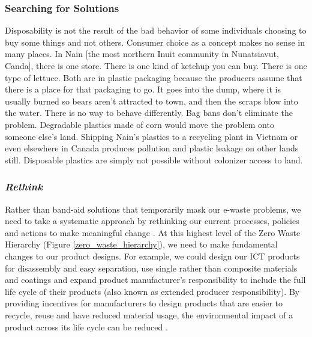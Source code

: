 \documentclass{article}
\begin{document}
\subsubsection{Searching for Solutions}
\begin{fquote}
Disposability is not the result of the bad behavior of some individuals choosing to buy some things and not others. Consumer choice as a concept makes no sense in many places. In Nain [the most northern Inuit community in Nunatsiavut, Canda], there is one store. There is one kind of ketchup you can buy. There is one type of lettuce. Both are in plastic packaging because the producers assume that there is a place for that packaging to go. It goes into the dump, where it is usually burned so bears aren't attracted to town, and then the scraps blow into the water. There is no way to behave differently. Bag bans don't eliminate the problem. Degradable plastics made of corn would move the problem onto someone else's land. Shipping Nain's plastics to a recycling plant in Vietnam or even elsewhere in Canada produces pollution and plastic leakage on other lands still. Disposable plastics are simply not possible without colonizer access to land.
\end{fquote}

\subsubsection*{\textit{Rethink}}
Rather than band-aid solutions that temporarily mask our e-waste problems, we need to take a systematic approach by rethinking our current processes, policies and actions to make meaningful change \cite{zerowastecanada2017hierarchy}. At this highest level of the Zero Waste Hierarchy (Figure \ref{zero_waste_hierarchy}), we need to make fundamental changes to our product designs. For example, we could design our ICT products for disassembly and easy separation, use single rather than composite materials and coatings and expand product manufacturer's responsibility to include the full life cycle of their products (also known as extended producer responsibility). By providing incentives for manufacturers to design products that are easier to recycle, reuse and have reduced material usage, the environmental impact of a product across its life cycle can be reduced \cite{walls2006extended}.
\end{document}
